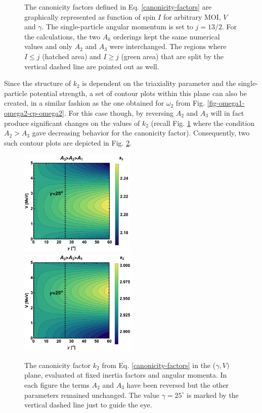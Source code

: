 \begin{figure}
    \caption{The canonicity factors defined in Eq. \ref{canonicity-factors} are graphically represented as function of spin $I$ for arbitrary MOI, $V$ and $\gamma$. The single-particle angular momentum is set to $j=13/2$. For the calculations, the two $A_k$ orderings kept the same numerical values and only $A_2$ and $A_3$ were interchanged. The regions where $I\leq j$ (hatched area) and $I\geq j$ (green area) that are split by the vertical dashed line are pointed out as well.}
    \label{fig-k-1-2-factors}
\end{figure}

Since the structure of $k_2$ is dependent on the triaxiality parameter and the single-particle potential strength, a set of contour plots within this plane can also be created, in a similar fashion as the one obtained for $\omega_2$ from Fig. \ref{fig-omega1-omega2-cp-omega2}. For this case though, by reversing $A_2$ and $A_3$ will in fact produce significant changes on the values of $k_2$ (recall Fig. \ref{fig-k-1-2-factors} where the condition $A_2>A_3$ gave decreasing behavior for the canonicity factor). Consequently, two such contour plots are depicted in Fig. \ref{fig-k2-factor-contour}.
\begin{figure}
    \centering
    \includegraphics[width=0.49\textwidth]{Chapters/Figures/k2_CP.pdf}
    \includegraphics[width=0.5\textwidth]{Chapters/Figures/k2_reversed_CP.pdf}
    \caption{The canonicity factor $k_2$ from Eq. \ref{canonicity-factors} in the ($\gamma,V)$ plane, evaluated at fixed inertia factors and angular momenta. In each figure the terms $A_2$ and $A_3$ have been reversed but the other parameters remained unchanged. The value $\gamma=25^\circ$ is marked by the vertical dashed line just to guide the eye.}
    \label{fig-k2-factor-contour}
\end{figure}

